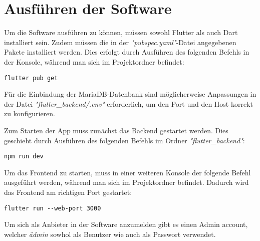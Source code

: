 \chapter{Ausführen der Software}

Um die Software ausführen zu können, müssen sowohl Flutter als auch Dart installiert sein. Zudem müssen die in der \textit{"pubspec.yaml"}-Datei angegebenen Pakete installiert werden. Dies erfolgt durch Ausführen des folgenden Befehls in der Konsole, während man sich im Projektordner befindet:
\newline
\begin{lstlisting}[caption={Installieren der benötigten Pakete}, label={lst:pubget}]
    flutter pub get
\end{lstlisting}

Für die Einbindung der MariaDB-Datenbank sind möglicherweise Anpassungen in der Datei \textit{"flutter\_backend/.env"} erforderlich, um den Port und den Host korrekt zu konfigurieren.

Zum Starten der App muss zunächst das Backend gestartet werden. Dies geschieht durch Ausführen des folgenden Befehls im Ordner \textit{"flutter\_backend"}:
\newline
\begin{lstlisting}[caption={Starten des Backends}, label={lst:backend}]
    npm run dev
\end{lstlisting}

Um das Frontend zu starten, muss in einer weiteren Konsole der folgende Befehl ausgeführt werden, während man sich im Projektordner befindet. Dadurch wird das Frontend am richtigen Port gestartet:
\newline
\begin{lstlisting}[caption={Starten des Frontends}, label={lst:frontend}]
    flutter run --web-port 3000
\end{lstlisting}

Um sich als Anbieter in der Software anzumelden gibt es einen Admin account, welcher \textit{\"{a}dmin} sowhol als Benutzer wie auch als
Passwort verwendet.